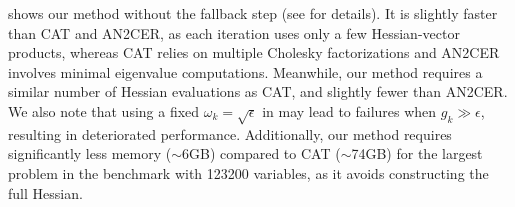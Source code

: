  shows our method without the fallback step (see  for details). 
It is slightly faster than CAT and AN2CER, 
as each iteration uses only a few Hessian-vector products, 
whereas CAT relies on multiple Cholesky factorizations and AN2CER involves minimal eigenvalue computations. 
Meanwhile, our method requires a similar number of Hessian evaluations as CAT, and slightly fewer than AN2CER.
We also note that using a fixed $\omega_k = \sqrt{\epsilon}$ in 
may lead to failures when $g_k \gg \epsilon$, resulting in deteriorated performance.
Additionally, our method requires significantly less memory ($\sim$6GB) compared to CAT ($\sim$74GB) for the largest problem in the benchmark with 123200 variables, as it avoids  constructing the full Hessian.
